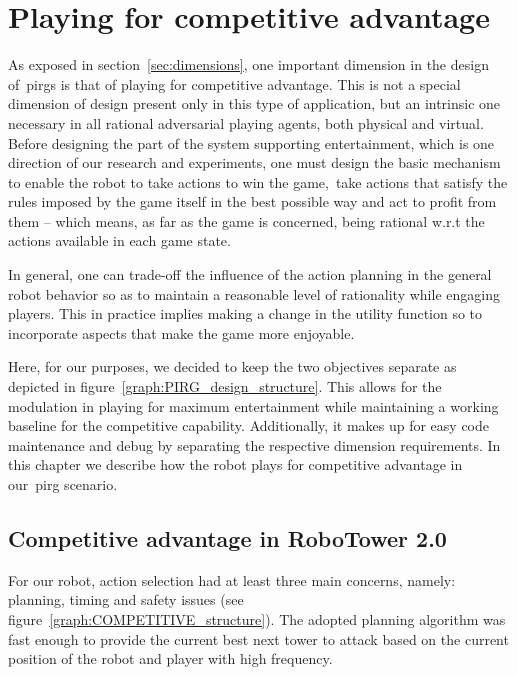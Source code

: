 \chapter{Playing for competitive advantage}\label{ch:playing_for_advantage}

As exposed in section~\ref{sec:dimensions}, one important dimension in the design of~\glspl{pirg} is that of playing for competitive advantage. This is not a special dimension of design present only in this type of application, but an intrinsic one necessary in all rational adversarial playing agents, both physical and virtual. Before designing the part of the system supporting  entertainment, which is one direction of our research and experiments, one must design the basic mechanism to enable the robot to take actions to win the game,~\ie take actions that satisfy the rules imposed by the game itself in the best possible way and act to profit from them -- which means, as far as the game is concerned, being rational w.r.t the actions available in each game state. 

In general, one can trade-off the influence of the action planning in the general robot behavior so as to maintain a reasonable level of rationality while engaging players. This in practice implies making a change in the utility function so to incorporate aspects that make the game more enjoyable.

Here, for our purposes, we decided to keep the two objectives separate as depicted in figure~\ref{graph:PIRG_design_structure}. This allows for the modulation in playing for maximum entertainment while maintaining a working baseline for the competitive capability. Additionally, it makes up for easy code maintenance and debug by separating the respective dimension requirements. In this chapter we describe how the robot plays for competitive advantage in our~\gls{pirg} scenario.

\section{Competitive advantage in RoboTower 2.0}\label{sec:competitive_adv_robotower2}

For our robot, action selection had at least three main concerns, namely: planning, timing and safety issues (see figure~\ref{graph:COMPETITIVE_structure}). The adopted planning algorithm was fast enough to provide the current best next tower to attack based on the current position of the robot and player with high frequency.

